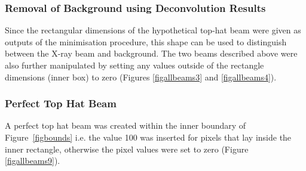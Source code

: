 \subsubsection{Removal of Background using Deconvolution Results}
Since the rectangular dimensions of the hypothetical top-hat beam were given as outputs of the minimisation procedure, this shape can be used to distinguish between the X-ray beam and background.
The two beams described above were also further manipulated by setting any values outside of the rectangle dimensions (inner box) to zero (Figures \ref{figallbeams3} and \ref{figallbeams4}).

\subsubsection{Perfect Top Hat Beam}
A perfect top hat beam was created within the inner boundary of Figure~\ref{figbounds}  i.e. the value 100 was inserted for pixels that lay inside the inner rectangle, otherwise the pixel values were set to zero (Figure \ref{figallbeams9}).


